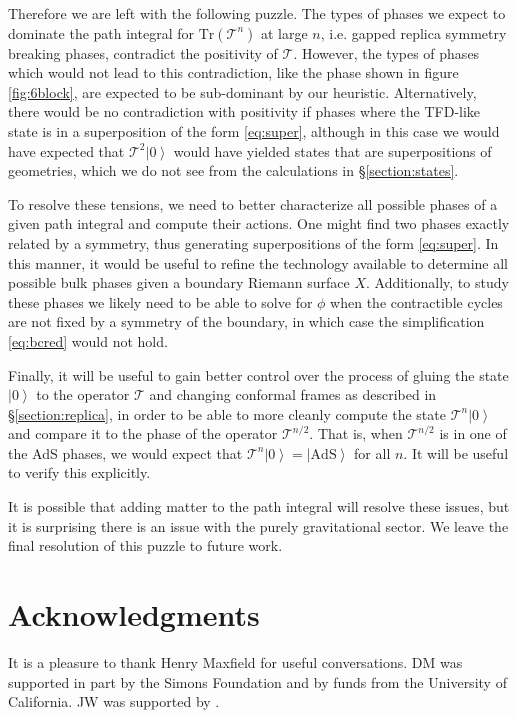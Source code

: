 \documentclass[letterpaper,12pt]{article}
\def\JW#1{{\color{LimeGreen}{ [#1]}}}
\newcommand{\Tr}{\text{Tr}}
\newcommand{\ket}[1]{\left| #1\right>}
\begin{document}
 Therefore we are left with the following puzzle. The types of phases we expect to dominate the path integral for $\Tr(\mathcal T^n)$ at large $n$, i.e. gapped replica symmetry breaking phases, contradict the positivity of $\mathcal T$. However, the types of phases which would not lead to this contradiction, like the phase shown in figure \ref{fig:6block}, are expected to be sub-dominant by our heuristic. Alternatively, there would be no contradiction with positivity if phases where the TFD-like state is in a superposition of the form \eqref{eq:super}, although in this case we would have expected that $\mathcal T^2\ket 0$ would have yielded states that are superpositions of geometries, which we do not see from the calculations in \S\ref{section:states}.

 To resolve these tensions, we need to better characterize all possible phases of a given path integral and compute their actions. One might find two phases exactly related by a symmetry, thus generating superpositions of the form \eqref{eq:super}. In this manner, it would be useful to refine the technology available to determine all possible bulk phases given a boundary Riemann surface $X$. Additionally, to study these phases we likely need to be able to solve for $\phi$ when the contractible cycles are not fixed by a symmetry of the boundary, in which case the simplification \eqref{eq:bcred} would not hold.

 Finally, it will be useful to gain better control over the process of gluing the state $\ket 0$ to the operator $\mathcal T$ and changing conformal frames as described in \S\ref{section:replica}, in order to be able to more cleanly compute the state $\mathcal T^n \ket 0$ and compare it to the phase of the operator $\mathcal T^{n/2}$. That is, when $\mathcal T^{n/2}$ is in one of the AdS phases, we would expect that $\mathcal T^n\ket 0 = \ket{\text{AdS}}$ for all $n$. It will be useful to verify this explicitly.

 It is possible that adding matter to the path integral will resolve these issues, but it is surprising there is an issue with the purely gravitational sector. We leave the final resolution of this puzzle to future work.


\section*{Acknowledgments}
It is a pleasure to thank Henry Maxfield for useful conversations. DM was supported in part by the Simons Foundation and by funds from the University of California. JW was supported by \JW{funding}.
\end{document}
